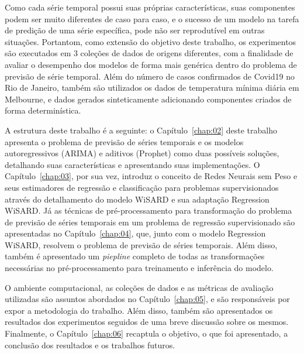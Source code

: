 Como cada série temporal possui suas próprias características, suas componentes podem ser muito diferentes de caso para caso, e o sucesso de um modelo na tarefa de predição de uma série específica, pode não ser reprodutível em outras situações. Portantom, como extensão do objetivo deste trabalho, os experimentos são executados em 3 coleções de dados de origens diferentes, com a finalidade de avaliar o desempenho dos modelos de forma mais genérica dentro do problema de previsão de série temporal. Além do número de casos confirmados de Covid19 no Rio de Janeiro, também são utilizados os dados de temperatura mínima diária em Melbourne, e dados gerados sinteticamente adicionando componentes criados de forma determinística.

A estrutura deste trabalho é a seguinte: o Capítulo~\ref{chap:02} deste trabalho apresenta o problema de previsão de séries temporais e os modelos autoregressivos (ARIMA) e aditivos (Prophet) como duas possíveis soluções, detalhando suas características e apresentando suas implementações. O Capítulo~\ref{chap:03}, por sua vez, introduz o conceito de Redes Neurais sem Peso e seus estimadores de regressão e classificação para problemas supervisionados através do detalhamento do modelo WiSARD e sua adaptação Regression WiSARD. Já as técnicas de pré-processamento para transformação do problema de previsão de séries temporais em um problema de regressão supervisionado são apresentadas no Capítulo~\ref{chap:04}, que, junto com o modelo Regression WiSARD, resolvem o problema de previsão de séries temporais. Além disso, também é apresentado um \textit{piepline} completo de todas as transformações necessárias no pré-processamento para treinamento e inferência do modelo.

O ambiente computacional, as coleções de dados e as métricas de avaliação utilizadas são assuntos abordados no Capítulo~\ref{chap:05}, e são responsáveis por expor a metodologia do trabalho. Além disso, também são apresentados os resultados dos experimentos seguidos de uma breve discussão sobre os mesmos. Finalmente, o Capítulo~\ref{chap:06} recaptula o objetivo, o que foi apresentado, a conclusão dos resultados e os trabalhos futuros.